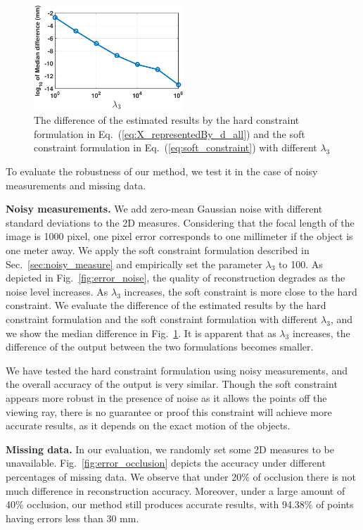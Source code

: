 \begin{figure}[t]
\centering
\includegraphics[width=0.5\textwidth]{chapter5/resource/different_lambda.pdf}
\caption{The difference of the estimated results by the hard constraint formulation in Eq.~(\ref{eq:X_representedBy_d_all}) and the soft constraint formulation in Eq.~(\ref{eq:soft_constraint}) with different $\lambda_3$} 
\label{fig:soft_hard_diff}
\end{figure}

To evaluate the robustness of our method, we test it in the case of noisy measurements and missing data.

\textbf{Noisy measurements.} We add zero-mean Gaussian noise with different standard deviations to the 2D measures. Considering that the focal length of the image is 1000 pixel, one pixel error corresponds to one millimeter if the object is one meter away.
We apply the soft constraint formulation described in Sec.~\ref{sec:noisy_measure} and empirically set the parameter $\lambda_3$ to 100. As depicted in Fig.~\ref{fig:error_noise}, the quality of reconstruction degrades as the noise level increases. As $\lambda_3$ increases, the soft constraint is more close to the hard constraint. %
We evaluate the difference of the estimated results by the hard constraint formulation and the soft constraint formulation with different $\lambda_3$, and we show the median difference in Fig.~\ref{fig:soft_hard_diff}. It is apparent that as $\lambda_3$ increases, the difference of the output between the two formulations becomes smaller.

We have tested the hard constraint formulation using noisy measurements, and the overall accuracy of the output is very similar. Though the soft constraint appears more robust in the presence of noise as it allows the points off the viewing ray, there is no guarantee or proof this constraint will achieve more accurate results, as it depends on the exact motion of the objects.


\textbf{Missing data.} %
In our evaluation, we randomly set some 2D measures to be unavailable. Fig.~\ref{fig:error_occlusion} depicts the accuracy under different percentages of missing data. We observe that under 20\% of occlusion there is not much difference in reconstruction accuracy. Moreover, under a large amount of 40\% occlusion, our method still produces accurate results,  with 94.38\% of points having errors less than 30 mm. 

